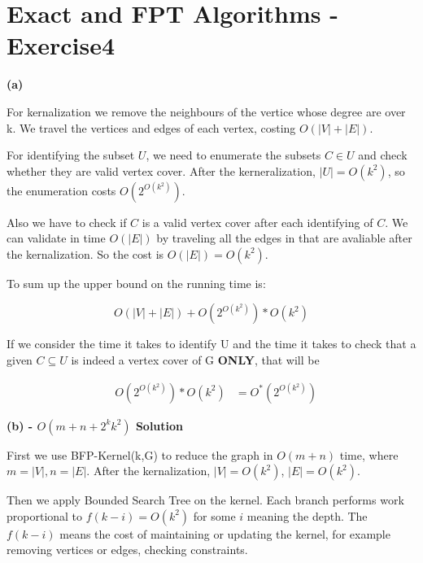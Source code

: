 \documentclass[12pt]{article}
\begin{document}
\section{Exact and FPT Algorithms - Exercise4}

\textbf{(a)}

For kernalization we remove the neighbours of the vertice whose degree are over k. We travel the vertices and edges of each vertex, costing $O(|V| + |E|)$. 

For identifying the subset $U$, we need to enumerate the subsets $C \in U$ and check whether they are valid vertex cover. After the kerneralization, $|U| = O(k^2)$, so the enumeration costs $O(2^{O(k^2)})$.

Also we have to check if $C$ is a valid vertex cover after each identifying of $C$. We can validate in time $O(|E|)$ by traveling all the edges in that are avaliable after the kernalization. So the cost is $O(|E|)=O(k^2)$.

To sum up the upper bound on the running time is:

\begin{equation}
O(|V| + |E|) + O(2^{O(k^2)}) * O(k^2)
\end{equation}

If we consider the time it takes to identify U and the time it takes to check that a given $C \subseteq U$ is indeed a vertex cover of G \textbf{ONLY}, that will be

\begin{equation}
\begin{aligned}
&O(2^{O(k^2)}) * O(k^2)
&=O^*(2^{O(k^2)}) 
\end{aligned}
\end{equation}


\textbf{(b) - $O(m+n+2^k k^2)$ Solution}


First we use BFP-Kernel(k,G) to reduce the graph in $O(m+n)$ time, where $m=|V|, n=|E|$. After the kernalization, $|V|=O(k^2)$, $|E|=O(k^2)$.

Then we apply Bounded Search Tree on the kernel. Each branch performs work proportional to $f(k-i)=O(k^2)$ for some $i$ meaning the depth. The $f(k-i)$ means the cost of maintaining or updating the kernel, for example removing vertices or edges, checking constraints.
\end{document}
